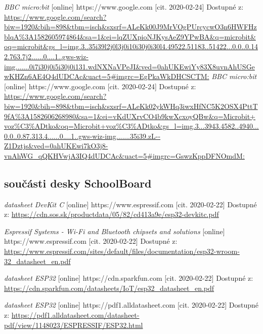 \documentclass{template/socthesis}
\begin{document}
\begin{thebibliography}{12}
	\textit{BBC micro:bit} [online] https://www.google.com [cit. 2020-02-24] Dostupné z:
	\url{https://www.google.com/search?biw=1920&bih=898&tbm=isch&sxsrf=ALeKk00J9MrVOgPUrcycwO3n6HWFHzblqA%3A1582605974864&sa=1&ei=lqZUXpioNJKysAeZ9YPwBA&q=microbit&oq=microbit&gs_l=img.3..35i39l2j0l3j0i10i30j0i30l4.49522.51183..51422...0.0..0.142.763.7j2......0....1..gws-wiz-img.......0i7i30j0i5i30j0i131.wdNXNaVPeJI&ved=0ahUKEwiYy83X8uvnAhUSGewKHZn6AE4Q4dUDCAc&uact=5#imgrc=EgPkaWkDHCSCTM:}
	\textit{BBC micro:bit} [online] https://www.google.com [cit. 2020-02-24] Dostupné z:
	\url{https://www.google.com/search?biw=1920&bih=898&tbm=isch&sxsrf=ALeKk02ykWHq3iwxHfNC5K2OSX4PttT9fA%3A1582606268980&sa=1&ei=vKdUXrvCO4b9kwXcxoyQBw&q=Microbit+voz%C3%ADtko&oq=Microbit+voz%C3%ADtko&gs_l=img.3...3943.4582..4940...0.0..0.87.313.4......0....1..gws-wiz-img.......35i39.zL--Z1Dztjs&ved=0ahUKEwi7kO3j8-vnAhWG_qQKHVwjA3IQ4dUDCAc&uact=5#imgrc=GswzKppDFNOmdM:}
			
			
			\subsection*{součásti desky SchoolBoard}
			
			
			\textit{datasheet DevKit C} [online] https://www.espressif.com [cit. 2020-02-22] Dostupné z:
			\url{https://cdn.sos.sk/productdata/05/82/cd413a9e/esp32-devkitc.pdf}
			
			\textit{Espressif Systems - Wi-Fi and Bluetooth chipsets and solutions } [online] https://www.espressif.com [cit. 2020-02-22] Dostupné z:
			\url{https://www.espressif.com/sites/default/files/documentation/esp32-wroom-32_datasheet_en.pdf}
			
			\textit{datasheet ESP32} [online] https://cdn.sparkfun.com [cit. 2020-02-22] Dostupné z:
			\url{https://cdn.sparkfun.com/datasheets/IoT/esp32_datasheet_en.pdf}
			
			\textit{datasheet ESP32} [online] https://pdf1.alldatasheet.com [cit. 2020-02-22] Dostupné z:
			\url{https://pdf1.alldatasheet.com/datasheet-pdf/view/1148023/ESPRESSIF/ESP32.html}
			

\end{thebibliography}
\end{document}
